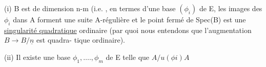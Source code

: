  (i) B est de dimension n-m (i.e. , en termes d'une base  $(\phi_i)$ de
\margin{$\|$} E, les images des $\phi_i$ dans A forment une suite A-régulière et  le
 point fermé de Spec(B) est une \uline{singularité quadratique}
ordinaire (par quoi nous entendons que l'augmentation $B\to B/\underline{n}$ est  quadra-%
tique ordinaire).

(ii) Il existe une base $\phi_1 ,\ldots., \phi_m$ de E telle que \hand{\unsure{$\sqrt{\ }$}}$A/$$u(\phi i)A$

